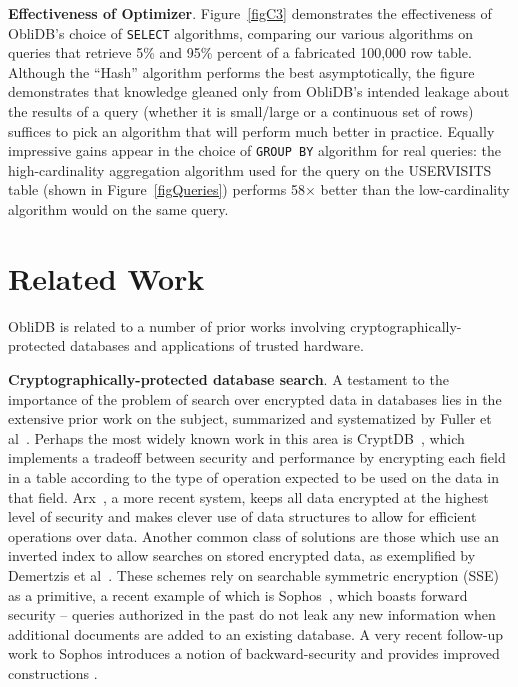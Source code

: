 \documentclass[letterpaper,twocolumn,10pt]{article}
\def\name/{ObliDB}
\begin{document}
\noindent \textbf{Effectiveness of Optimizer}.
Figure~\ref{figC3} demonstrates the effectiveness of \name/'s choice of \texttt{SELECT} algorithms, comparing our various algorithms on queries that retrieve 5\% and 95\% percent of a fabricated 100,000 row table. Although the ``Hash'' algorithm performs the best asymptotically, the figure demonstrates that knowledge gleaned only from \name/'s intended leakage about the results of a query (whether it is small/large or a continuous set of rows) suffices to pick an algorithm that will perform much better in practice. Equally impressive gains appear in the choice of \texttt{GROUP BY} algorithm for real queries: the high-cardinality aggregation algorithm used for the query on the USERVISITS table (shown in Figure~\ref{figQueries}) performs 58$\times$ better than the low-cardinality algorithm would on the same query.

\section{Related Work}\label{related}

\name/ is related to a number of prior works involving cryptographically-protected databases and applications of trusted hardware.

  \noindent \textbf{Cryptographically-protected database search}.
A testament to the importance of the problem of search over encrypted data in databases lies in the extensive prior work on the subject, summarized and systematized by Fuller et al~\cite{FVY+17}. Perhaps the most widely known work in this area is CryptDB~\cite{PRZB12}, which implements a tradeoff between security and performance by encrypting each field in a table according to the type of operation expected to be used on the data in that field. Arx~\cite{PBP16}, a more recent system, keeps all data encrypted at the highest level of security and makes clever use of data structures to allow for efficient operations over data. Another common class of solutions are those which use an inverted index to allow searches on stored encrypted data, as exemplified by Demertzis et al~\cite{DPP+16}. These schemes rely on searchable symmetric encryption (SSE) as a primitive, a recent example of which is Sophos~\cite{Bost16}, which boasts forward security -- queries authorized in the past do not leak any new information when additional documents are added to an existing database. A very recent follow-up work to Sophos introduces a notion of backward-security and provides improved constructions \cite{BMO17}.
\end{document}
